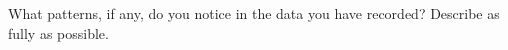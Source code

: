 \begin{questions}
\newpage

\vspace*{\fill}

\question What patterns, if any, do you notice in the data you have recorded?  Describe as fully as possible. \fillwithlines{5cm}

\end{questions}
